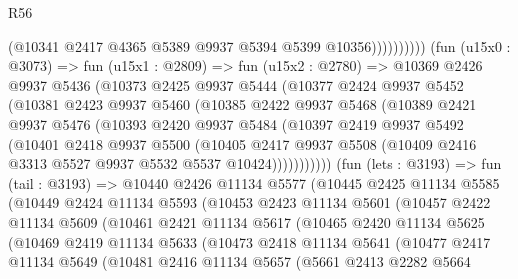 \begin{lexlean}{R56}
\begin{coremodule}
                          (@10341 @2417 @4365 @5389 @9937 @5394 @5399 @10356))))))))))
        (fun (u15x0 : @3073) =>
        fun (u15x1 : @2809) =>
        fun (u15x2 : @2780) =>
        @10369
          @2426
          @9937
          @5436
          (@10373
            @2425
            @9937
            @5444
            (@10377
              @2424
              @9937
              @5452
              (@10381
                @2423
                @9937
                @5460
                (@10385
                  @2422
                  @9937
                  @5468
                  (@10389
                    @2421
                    @9937
                    @5476
                    (@10393
                      @2420
                      @9937
                      @5484
                      (@10397
                        @2419
                        @9937
                        @5492
                        (@10401
                          @2418
                          @9937
                          @5500
                          (@10405
                            @2417
                            @9937
                            @5508
                            (@10409 @2416 @3313 @5527 @9937 @5532 @5537 @10424)))))))))))
        (fun (lets : @3193) =>
        fun (tail : @3193) =>
        @10440
          @2426
          @11134
          @5577
          (@10445
            @2425
            @11134
            @5585
            (@10449
              @2424
              @11134
              @5593
              (@10453
                @2423
                @11134
                @5601
                (@10457
                  @2422
                  @11134
                  @5609
                  (@10461
                    @2421
                    @11134
                    @5617
                    (@10465
                      @2420
                      @11134
                      @5625
                      (@10469
                        @2419
                        @11134
                        @5633
                        (@10473
                          @2418
                          @11134
                          @5641
                          (@10477
                            @2417
                            @11134
                            @5649
                            (@10481
                              @2416
                              @11134
                              @5657
                              (@5661
                                @2413
                                @2282
                                @5664

\end{coremodule}
\end{lexlean}
